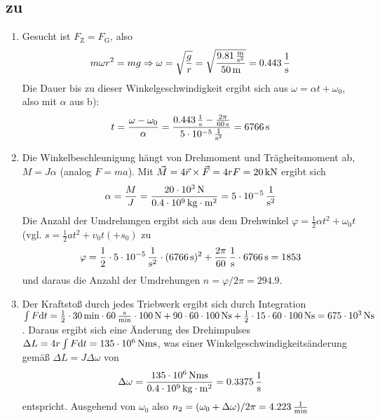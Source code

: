 \documentclass[a4paper]{scrartcl}
\begin{document}
\subsection{zu }
\label{lsg:Raumstation}
\begin{enumerate}[noitemsep]
  \item Gesucht ist $F_\text{Z} = F_\text{G}$, also
    \begin{equation*}
      m\omega r^2 = mg \Rightarrow \omega = \sqrt{\frac{g}{r}} = \sqrt{\frac{\unit[9.81]{\frac{m}{s^2}}}{\unit[50]{m}}} = \unit[0.443]{\frac{1}{s}}
    \end{equation*}
    Die Dauer bis zu dieser Winkelgeschwindigkeit ergibt sich aus $\omega = \alpha t+\omega_0$, also mit $\alpha$ aus b):
    \begin{equation*}
      t = \frac{\omega - \omega_0}{\alpha} = \frac{\unit[0.443]{\frac{1}{s}} - \frac{2\pi}{\unit[60]{s}}}{\unit[5\cdot10^{-5}]{\frac{1}{s^2}}} = \unit[6766]{s}
    \end{equation*}
  \item Die Winkelbeschleunigung hängt von Drehmoment und Trägheitsmoment ab, $M = J\alpha$ (analog $F = ma$). Mit $\vec M = 4 \vec r \times \vec F = 4rF = \unit[20]{kN}$ ergibt sich
    \begin{equation*}
      \alpha = \frac{M}{J} = \frac{\unit[20 \cdot 10^3]{N}}{\unit[0.4 \cdot 10^9]{kg \cdot m^2}} = \unit[5 \cdot 10^{-5}]{\frac{1}{s^2}}
    \end{equation*}
    Die Anzahl der Umdrehungen ergibt sich aus dem Drehwinkel $\varphi = \frac{1}{2}\alpha t^2 + \omega_0t$ (vgl. $s = \frac{1}{2}at^2 + v_0t (+s_0)$ zu 
    \begin{equation*}
      \varphi = \frac{1}{2} \cdot \unit[5\cdot 10^{-5}]{\frac{1}{s^2}} \cdot (\unit[6766]{s})^2 + \unit[\frac{2\pi}{60}]{\frac{1}{s}}\cdot \unit[6766]{s} = 1853
    \end{equation*}
    und daraus die Anzahl der Umdrehungen $n = \varphi / 2\pi = 294.9$.
  \item Der Kraftstoß durch jedes Triebwerk ergibt sich durch Integration $\int F \text{d}t = \frac{1}{2} \cdot \unit[30]{min} \cdot \unit[60]{\frac{s}{min}} \cdot \unit[100]{N} + \unit[90 \cdot 60 \cdot 100]{Ns} + \unit[\frac{1}{2} \cdot 15 \cdot 60 \cdot 100]{Ns} = \unit[675 \cdot 10^3]{Ns}$. Daraus ergibt sich eine Änderung des Drehimpulses $\Delta L = 4r \int F\text{d}t = \unit[135 \cdot 10^6]{Nms}$, was einer Winkelgeschwindigkeitsänderung gemäß $\Delta L = J \Delta \omega$ von
    \begin{equation*}
      \Delta \omega = \frac{\unit[135\cdot 10^6]{Nms}}{\unit[0.4 \cdot 10^9]{kg \cdot m^2}} = \unit[0.3375]{\frac{1}{s}}
    \end{equation*}
    entspricht. Ausgehend von $\omega_0$ also $n_2 = (\omega_0 + \Delta \omega) /2\pi = \unit[4.223]{\frac{1}{min}}$
\end{enumerate}
\end{document}
